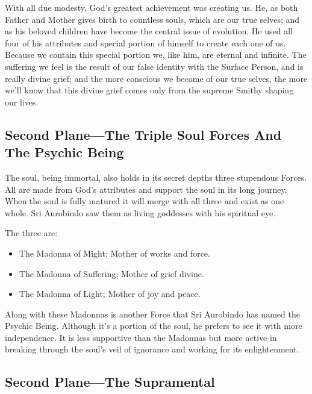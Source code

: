 \documentclass[12pt,a4paper]{book}
\begin{document}
With all due modesty, God's greatest achievement was creating us. He,
as both Father and Mother gives birth to countless souls, which are
our true selves; and as his beloved children have become the central
issue of evolution. He used all four of his attributes and special
portion of himself to create each one of us.  Because we contain this
special portion we, like him, are eternal and infinite. The suffering
we feel is the result of our false identity with the Surface Person,
and is really divine grief; and the more conscious we become of our
true selves, the more we'll know that this divine grief comes only
from the supreme Smithy shaping our lives.


\newpage
\begin{center}\section*{Second Plane---The Triple Soul Forces And The Psychic Being}\end{center}


The soul, being immortal, also holds in its secret depths three
stupendous Forces. All are made from God's attributes and support the
soul in its long journey. When the soul is fully matured it will merge
with all three and exist as one whole. Sri Aurobindo saw them as
living goddesses with his spiritual eye.

\noindent The three are:

\begin{itemize}
\item [] The Madonna of Might; Mother of works and force.
\item [] The Madonna of Suffering; Mother of grief divine.
\item [] The Madonna of Light; Mother of joy and peace.
\end{itemize}

Along with these Madonnas is another Force that Sri Aurobindo has
named the Psychic Being. Although it's a portion of the soul, he
prefers to see it with more independence. It is less supportive than
the Madonnas but more active in breaking through the soul's veil of
ignorance and working for its enlightenment.


\newpage
\begin{center}\section*{Second Plane---The Supramental}\end{center}
\end{document}
